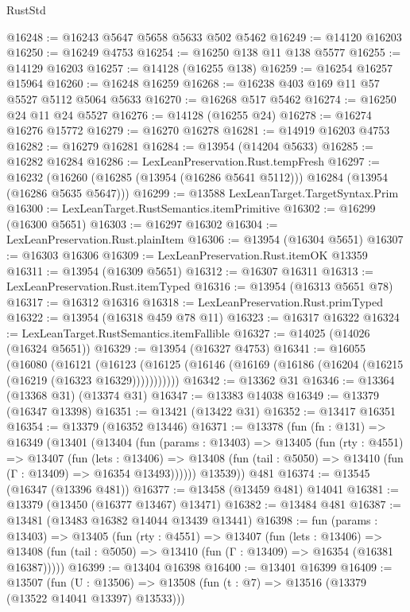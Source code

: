\begin{lexlean}{RustStd}
\begin{coremodule}
@16248 := @16243 @5647 @5658 @5633 @502 @5462
@16249 := @14120 @16203
@16250 := @16249 @4753
@16254 := @16250 @138 @11 @138 @5577
@16255 := @14129 @16203
@16257 := @14128 (@16255 @138)
@16259 := @16254 @16257 @15964
@16260 := @16248 @16259
@16268 := @16238 @403 @169 @11 @57 @5527 @5112 @5064 @5633
@16270 := @16268 @517 @5462
@16274 := @16250 @24 @11 @24 @5527
@16276 := @14128 (@16255 @24)
@16278 := @16274 @16276 @15772
@16279 := @16270 @16278
@16281 := @14919 @16203 @4753
@16282 := @16279 @16281
@16284 := @13954 (@14204 @5633)
@16285 := @16282 @16284
@16286 := LexLeanPreservation.Rust.tempFresh
@16297 := @16232
    (@16260 (@16285 (@13954 (@16286 @5641 @5112))) @16284 (@13954 (@16286 @5635 @5647)))
@16299 := @13588 LexLeanTarget.TargetSyntax.Prim
@16300 := LexLeanTarget.RustSemantics.itemPrimitive
@16302 := @16299 (@16300 @5651)
@16303 := @16297 @16302
@16304 := LexLeanPreservation.Rust.plainItem
@16306 := @13954 (@16304 @5651)
@16307 := @16303 @16306
@16309 := LexLeanPreservation.Rust.itemOK @13359
@16311 := @13954 (@16309 @5651)
@16312 := @16307 @16311
@16313 := LexLeanPreservation.Rust.itemTyped
@16316 := @13954 (@16313 @5651 @78)
@16317 := @16312 @16316
@16318 := LexLeanPreservation.Rust.primTyped
@16322 := @13954 (@16318 @459 @78 @11)
@16323 := @16317 @16322
@16324 := LexLeanTarget.RustSemantics.itemFallible
@16327 := @14025 (@14026 (@16324 @5651))
@16329 := @13954 (@16327 @4753)
@16341 := @16055
    (@16080
      (@16121
        (@16123 (@16125 (@16146 (@16169 (@16186 (@16204 (@16215 (@16219 (@16323 @16329)))))))))))
@16342 := @13362 @31
@16346 := @13364 (@13368 @31) (@13374 @31)
@16347 := @13383 @14038
@16349 := @13379 (@16347 @13398)
@16351 := @13421 (@13422 @31)
@16352 := @13417 @16351
@16354 := @13379 (@16352 @13446)
@16371 := @13378
    (fun (fn : @131) =>
    @16349
      (@13401
        (@13404
          (fun (params : @13403) =>
          @13405
            (fun (rty : @4551) =>
            @13407
              (fun (lets : @13406) =>
              @13408 (fun (tail : @5050) => @13410 (fun (Γ : @13409) => @16354 @13493))))))
        @13539))
    @481
@16374 := @13545 (@16347 (@13396 @481))
@16377 := @13458 (@13459 @481) @14041
@16381 := @13379 (@13450 (@16377 @13467) @13471)
@16382 := @13484 @481
@16387 := @13481 (@13483 @16382 @14044 @13439 @13441)
@16398 := fun (params : @13403) =>
  @13405
    (fun (rty : @4551) =>
    @13407
      (fun (lets : @13406) =>
      @13408 (fun (tail : @5050) => @13410 (fun (Γ : @13409) => @16354 (@16381 @16387)))))
@16399 := @13404 @16398
@16400 := @13401 @16399
@16409 := @13507
    (fun (U : @13506) => @13508 (fun (t : @7) => @13516 (@13379 (@13522 @14041 @13397) @13533)))

\end{coremodule}
\end{lexlean}
